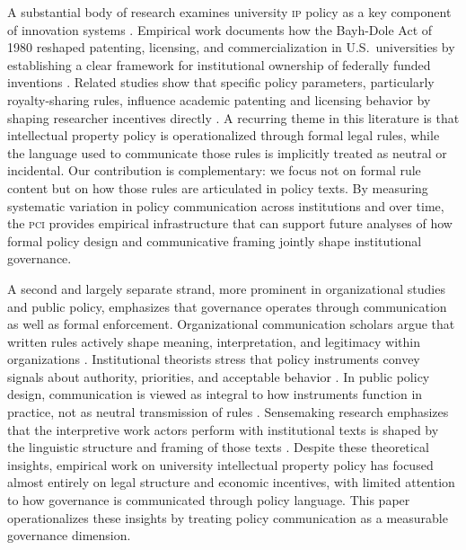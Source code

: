 \documentclass[12pt]{article}
\newcommand{\PCI}{\textsc{pci}}
\newcommand{\IP}{\textsc{ip}}
\begin{document}
A substantial body of research examines university \IP{} policy as a key component
of innovation systems \citep{Arrow1962, Dosi1988, Nelson1993}.  Empirical work
documents how the Bayh-Dole Act of 1980 reshaped patenting, licensing, and
commercialization in U.S.\ universities by establishing a clear framework for
institutional ownership of federally funded inventions \citep{Mowery2001, Mowery2004,
Sampat2006}.  Related studies show that specific policy parameters, particularly
royalty-sharing rules, influence academic patenting and licensing behavior by shaping
researcher incentives directly \citep{Lach2008, Ouellette2020}.  A recurring theme
in this literature is that intellectual property policy is operationalized through
formal legal rules, while the language used to communicate those rules is implicitly
treated as neutral or incidental.  Our contribution is complementary: we focus not
on formal rule content but on how those rules are articulated in policy texts.
By measuring systematic variation in policy communication across institutions and
over time, the \PCI{} provides empirical infrastructure that can support future
analyses of how formal policy design and communicative framing jointly shape
institutional governance.

A second and largely separate strand, more prominent in organizational studies and
public policy, emphasizes that governance operates through communication as well as
formal enforcement.  Organizational communication scholars argue that written rules
actively shape meaning, interpretation, and legitimacy within organizations
\citep{Eisenberg2004, Putnam2009}.  Institutional theorists stress that policy
instruments convey signals about authority, priorities, and acceptable behavior
\citep{Scott2013}.  In public policy design, communication is viewed as integral to
how instruments function in practice, not as neutral transmission of rules
\citep{Howlett2023}.  Sensemaking research emphasizes that the interpretive work actors
perform with institutional texts is shaped by the linguistic structure and framing of
those texts \citep{Maitlis2014}.  Despite these theoretical insights, empirical work
on university intellectual property policy has focused almost entirely on legal
structure and economic incentives, with limited attention to how governance is
communicated through policy language.  This paper operationalizes these insights by
treating policy communication as a measurable governance dimension.
\end{document}
